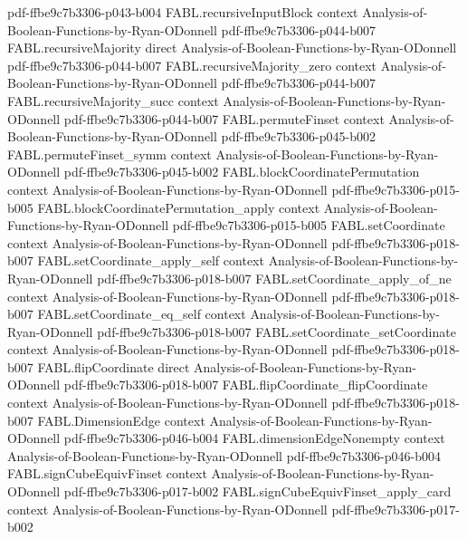 \begin{theorem}
  {pdf-ffbe9c7b3306-p043-b004}
\proofstep
  {FABL.recursiveInputBlock}
  {context}
  {Analysis-of-Boolean-Functions-by-Ryan-ODonnell}
  {pdf-ffbe9c7b3306-p044-b007}
\proofstep
  {FABL.recursiveMajority}
  {direct}
  {Analysis-of-Boolean-Functions-by-Ryan-ODonnell}
  {pdf-ffbe9c7b3306-p044-b007}
\proofstep
  {FABL.recursiveMajority_zero}
  {context}
  {Analysis-of-Boolean-Functions-by-Ryan-ODonnell}
  {pdf-ffbe9c7b3306-p044-b007}
\proofstep
  {FABL.recursiveMajority_succ}
  {context}
  {Analysis-of-Boolean-Functions-by-Ryan-ODonnell}
  {pdf-ffbe9c7b3306-p044-b007}
\proofstep
  {FABL.permuteFinset}
  {context}
  {Analysis-of-Boolean-Functions-by-Ryan-ODonnell}
  {pdf-ffbe9c7b3306-p045-b002}
\proofstep
  {FABL.permuteFinset_symm}
  {context}
  {Analysis-of-Boolean-Functions-by-Ryan-ODonnell}
  {pdf-ffbe9c7b3306-p045-b002}
\proofstep
  {FABL.blockCoordinatePermutation}
  {context}
  {Analysis-of-Boolean-Functions-by-Ryan-ODonnell}
  {pdf-ffbe9c7b3306-p015-b005}
\proofstep
  {FABL.blockCoordinatePermutation_apply}
  {context}
  {Analysis-of-Boolean-Functions-by-Ryan-ODonnell}
  {pdf-ffbe9c7b3306-p015-b005}
\proofstep
  {FABL.setCoordinate}
  {context}
  {Analysis-of-Boolean-Functions-by-Ryan-ODonnell}
  {pdf-ffbe9c7b3306-p018-b007}
\proofstep
  {FABL.setCoordinate_apply_self}
  {context}
  {Analysis-of-Boolean-Functions-by-Ryan-ODonnell}
  {pdf-ffbe9c7b3306-p018-b007}
\proofstep
  {FABL.setCoordinate_apply_of_ne}
  {context}
  {Analysis-of-Boolean-Functions-by-Ryan-ODonnell}
  {pdf-ffbe9c7b3306-p018-b007}
\proofstep
  {FABL.setCoordinate_eq_self}
  {context}
  {Analysis-of-Boolean-Functions-by-Ryan-ODonnell}
  {pdf-ffbe9c7b3306-p018-b007}
\proofstep
  {FABL.setCoordinate_setCoordinate}
  {context}
  {Analysis-of-Boolean-Functions-by-Ryan-ODonnell}
  {pdf-ffbe9c7b3306-p018-b007}
\proofstep
  {FABL.flipCoordinate}
  {direct}
  {Analysis-of-Boolean-Functions-by-Ryan-ODonnell}
  {pdf-ffbe9c7b3306-p018-b007}
\proofstep
  {FABL.flipCoordinate_flipCoordinate}
  {context}
  {Analysis-of-Boolean-Functions-by-Ryan-ODonnell}
  {pdf-ffbe9c7b3306-p018-b007}
\proofstep
  {FABL.DimensionEdge}
  {context}
  {Analysis-of-Boolean-Functions-by-Ryan-ODonnell}
  {pdf-ffbe9c7b3306-p046-b004}
\proofstep
  {FABL.dimensionEdgeNonempty}
  {context}
  {Analysis-of-Boolean-Functions-by-Ryan-ODonnell}
  {pdf-ffbe9c7b3306-p046-b004}
\proofstep
  {FABL.signCubeEquivFinset}
  {context}
  {Analysis-of-Boolean-Functions-by-Ryan-ODonnell}
  {pdf-ffbe9c7b3306-p017-b002}
\proofstep
  {FABL.signCubeEquivFinset_apply_card}
  {context}
  {Analysis-of-Boolean-Functions-by-Ryan-ODonnell}
  {pdf-ffbe9c7b3306-p017-b002}

\end{theorem}
